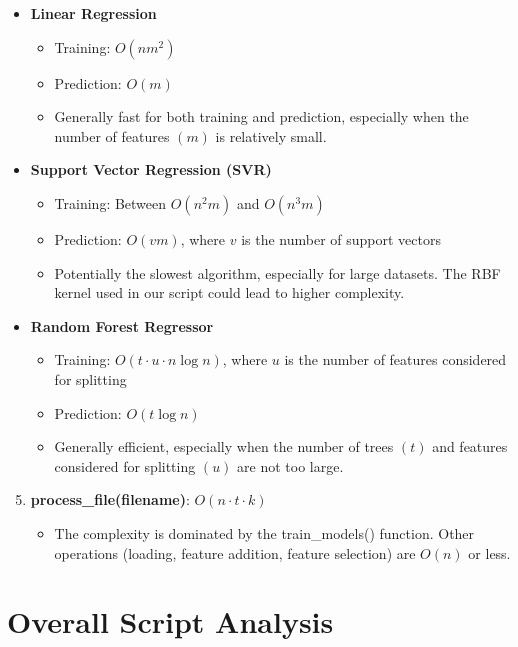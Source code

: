 \documentclass[11pt,a4paper]{article}
\begin{document}
\begin{itemize}
    \item \textbf{Linear Regression}
    \begin{itemize}
        \item Training: $O(nm^2)$
        \item Prediction: $O(m)$
        \item Generally fast for both training and prediction, especially when the number of features $(m)$ is relatively small.
    \end{itemize}
    
    \item \textbf{Support Vector Regression (SVR)}
    \begin{itemize}
        \item Training: Between $O(n^2m)$ and $O(n^3m)$
        \item Prediction: $O(vm)$, where $v$ is the number of support vectors
        \item Potentially the slowest algorithm, especially for large datasets. The RBF kernel used in our script could lead to higher complexity.
    \end{itemize}
    
    \item \textbf{Random Forest Regressor}
    \begin{itemize}
        \item Training: $O(t \cdot u \cdot n \log n)$, where $u$ is the number of features considered for splitting
        \item Prediction: $O(t \log n)$
        \item Generally efficient, especially when the number of trees $(t)$ and features considered for splitting $(u)$ are not too large.
    \end{itemize}
\end{itemize}

\begin{enumerate}
    \setcounter{enumi}{4}
    \item \textbf{process\_file(filename)}: $O(n \cdot t \cdot k)$
    \begin{itemize}
        \item The complexity is dominated by the train\_models() function. Other operations (loading, feature addition, feature selection) are $O(n)$ or less.
    \end{itemize}
\end{enumerate}

\section{Overall Script Analysis}
\end{document}
